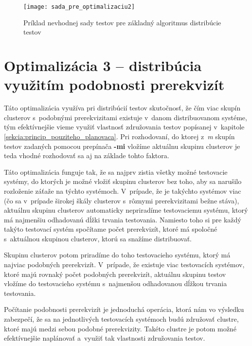 \begin{figure}[h]
  \begin{center}
    \texttt{[image: sada\_pre\_optimalizaciu2]}
    \caption{Príklad nevhodnej sady testov pre základný algoritmus 
             distribúcie testov}
    \label{obrazok:sada_pre_optimalizaciu2}
  \end{center}
\end{figure}



\section{Optimalizácia 3 -- distribúcia využitím podobnosti prerekvizít}
\label{sekcia:optimalizacia3}
Táto optimalizácia využíva pri distribúcií testov skutočnosť, že čím viac
skupín clusterov s~podobnými prerekvizitami existuje v~danom 
distribuovanom systéme, tým efektívnejšie vieme využiť vlastnosť 
združovania testov popísanej v~kapitole 
\ref{sekcia:princip_pouziteho_planovaca}.
Pri rozhodovaní, do ktorej z~\textit{m} skupín testov zadaných pomocou 
prepínača \textbf{-mi} vložíme aktuálnu skupinu clusterov je teda vhodné 
rozhodovať sa aj na základe tohto faktora.

Táto optimalizácia funguje tak, že sa najprv zistia všetky možné 
testovacie systémy, do ktorých je možné vložiť skupinu clusterov bez toho, 
aby sa narušilo rozloženie záťaže na týchto systémoch. 
V~prípade, že je takýchto systémov viac (čo sa v~prípade širokej škály 
clusterov s~rôznymi prerekvizitami bežne stáva),
aktuálnu skupinu clusterov automaticky nepriradíme testovaciemu systému, 
ktorý má najmenšiu odhadovanú dĺžki trvania testovania. 
Namiesto toho si pre každý takýto testovací systém spočítame počet 
prerekvizít, ktoré má spoločné s~aktuálnou skupinou clusterov, ktorú 
sa snažíme distribuovať. 

Skupinu clusterov potom priradíme do toho testovacieho systému, ktorý 
má najviac podobných prerekvizít. V~prípade, že existuje viac 
testovacích systémov, ktoré majú rovnaký počet podobných prerekvizít, 
aktuálnu skupinu testov vložíme do testovacieho systému s~najmenšou
odhadovanou dĺžkou trvania testovania.

Počítanie podobnosti prerekvizít je jednoduchá operácia, ktorá nám vo 
výsledku zabezpečí, že sa na jednotlivých testovacích systémoch budú 
združovať clustre, ktoré majú medzi sebou podobné prerekvizity. 
Takéto clustre je potom možné efektívnejšie naplánovať a~využiť tak 
vlastnosti združovania testov.

